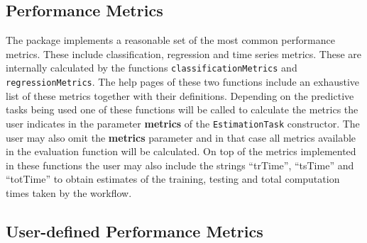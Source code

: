 \documentclass[10pt,a4paper]{article}\usepackage[]{graphicx}\usepackage[]{color}
\begin{document}
\subsection{Performance Metrics}

The package implements a reasonable set of the most common performance metrics. These include classification, regression and time series metrics. These are internally calculated by the functions \texttt{classificationMetrics} and \texttt{regressionMetrics}. The help pages of these two functions include an exhaustive list of these metrics together with their definitions. Depending on the predictive tasks being used one of these functions will be called to calculate the metrics the user indicates in the parameter \textbf{metrics} of the \texttt{EstimationTask} constructor. The user may also omit the \textbf{metrics} parameter and in that case all metrics available in the evaluation function will be calculated. On top of the metrics implemented in these functions the user may also include the strings ``trTime'', ``tsTime'' and ``totTime'' to obtain estimates of the training, testing and total computation times taken by the workflow. 


\subsection{User-defined Performance Metrics}
\end{document}

